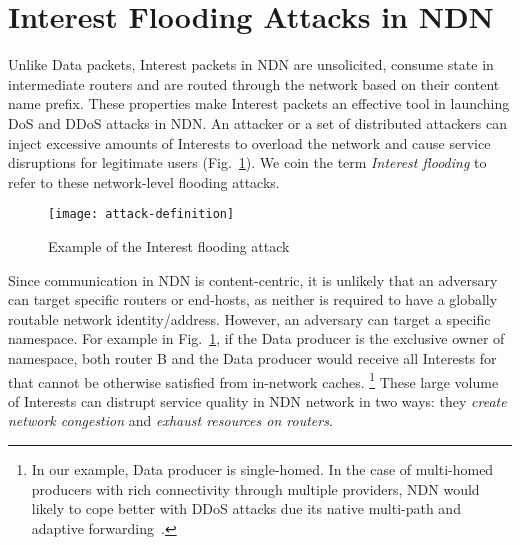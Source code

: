 \section{Interest Flooding Attacks in NDN}
\label{sec:interest flooding}




Unlike Data packets, Interest packets in NDN are unsolicited, consume state in intermediate routers and are routed through the network based on their content name prefix. These properties make Interest packets an effective tool in launching DoS and DDoS attacks in NDN. An attacker or a set of distributed attackers can inject excessive amounts of Interests to overload the network and cause service disruptions for legitimate users (Fig.~\ref{fig:flooding example}). We coin the term \emph{Interest flooding} to refer to these network-level flooding attacks.

\begin{figure}[htbp]
  \centering
  \texttt{[image: attack-definition]}
  \caption{Example of the Interest flooding attack}
  \label{fig:flooding example}
\end{figure}


Since communication in NDN is content-centric, it is unlikely that an adversary can target specific routers or end-hosts, as neither is required to have a globally routable network identity/address. However, an adversary can target a specific namespace.
For example in Fig.~\ref{fig:flooding example}, if the Data producer is the exclusive owner of  namespace, both router B and the Data producer would receive all Interests for  that cannot be otherwise satisfied from in-network caches. \footnote {In our example, Data producer is single-homed. In the case of multi-homed producers with rich connectivity through multiple providers, NDN would likely to cope better with DDoS attacks due its native multi-path and adaptive forwarding~\cite{adaptive-forwarding}.} These large volume of Interests can distrupt service quality in NDN network in two ways: they \emph{create network congestion} and \emph{exhaust resources on routers}.


